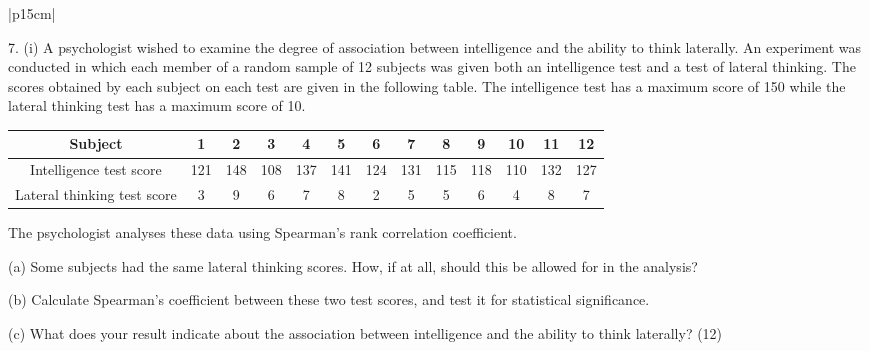 \documentclass[a4paper,12pt]{article}
\begin{document}

\begin{table}[ht!]
 
\centering
 
\begin{tabular}{|p{15cm}|}
 
\hline  

7. (i) A psychologist wished to examine the degree of association between intelligence and the ability to think laterally.  An experiment was conducted in which each member of a random sample of 12 subjects was given both an intelligence test and a test of lateral thinking.  The scores obtained by each subject on each test are given in the following table.  The intelligence test has a maximum score of 150 while the lateral thinking test has a maximum score of 10. 

\begin{tabular}{|c|cccccccccccc|} \hline
Subject & 1 & 2 & 3 & 4 & 5 & 6 & 7 & 8 & 9 & 10 & 11 & 12 \\ \hline 
Intelligence test score & 121 &  148 & 108 & 137 & 141&  124 & 131&  115&  118&  110&  132&  127 \\ \hline
Lateral thinking test score & 3 & 9 & 6 & 7 & 8 & 2 & 5 & 5 & 6 & 4 & 8 & 7 \\ \hline
\end{tabular}
 
The psychologist analyses these data using Spearman's rank correlation coefficient. 
 
(a) Some subjects had the same lateral thinking scores.  How, if at all, should this be allowed for in the analysis? 
 
(b) Calculate Spearman's coefficient between these two test scores, and test it for statistical significance. 
 
(c) What does your result indicate about the association between intelligence and the ability to think laterally? (12) 
  

\\ \hline
  
\end{tabular}

\end{table}  
\end{document}
